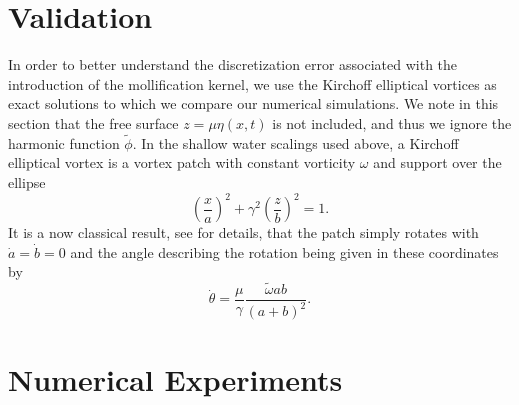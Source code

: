 \documentclass[a4paper,11pt]{article}
\begin{document}
\section*{Validation}
In order to better understand the discretization error associated with the introduction of the mollification kernel, we use the Kirchoff elliptical vortices \cite{mitchell,crosby} as exact solutions to which we compare our numerical simulations.  We note in this section that the free surface $z=\mu\eta(x,t)$ is not included, and thus we ignore the harmonic function $\tilde{\phi}$.  In the shallow water scalings used above, a Kirchoff elliptical vortex is a vortex patch with constant vorticity $\omega$ and support over the ellipse
\[
\left(\frac{x}{a}\right)^{2} + \gamma^{2}\left(\frac{z}{b} \right)^{2} = 1.
\]
It is a now classical result, see \cite{mitchell} for details, that the patch simply rotates with $\dot{a}=\dot{b}=0$ and the angle describing the rotation being given in these coordinates by 
\[
\dot{\theta} = \frac{\mu}{\gamma} \frac{\tilde{\omega}ab}{(a+b)^{2}}.
\]
\section*{Numerical Experiments}



\end{document}
